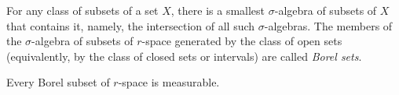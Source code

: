For any class of subsets of a set $X$, there is a smallest $\sigma$-algebra of subsets of $X$ that contains it, namely, the intersection of all such $\sigma$-algebras. The members of the $\sigma$-algebra of subsets of $r$-space generated by the class of open sets (equivalently, by the class of closed sets or intervals) are called \textit{Borel sets}.

Every Borel subset of $r$-space is measurable.
